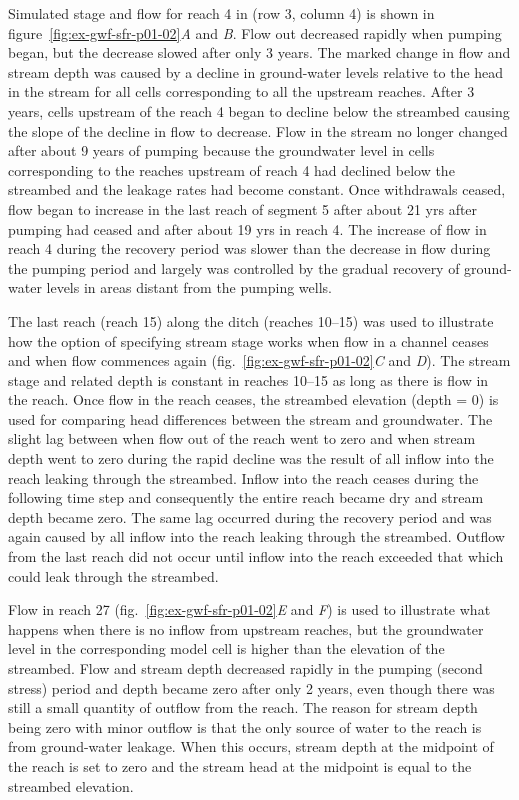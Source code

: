 Simulated stage and flow for reach 4 in (row 3, column 4) is shown in figure~\ref{fig:ex-gwf-sfr-p01-02}\textit{A} and \textit{B}. Flow out decreased rapidly when pumping began, but the decrease slowed after only 3 years. The marked change in flow and stream depth was caused by a decline in ground-water levels relative to the head in the stream for all cells corresponding to all the upstream reaches. After 3 years, cells upstream of the reach 4 began to decline below the streambed causing the slope of the decline in flow to decrease. Flow in the stream no longer changed after about 9 years of pumping because the groundwater level in cells corresponding to the reaches upstream of reach 4 had declined below the streambed and the leakage rates had become constant. Once withdrawals ceased, flow began to increase in the last reach of segment 5 after about 21 yrs after pumping had ceased and after about 19 yrs in reach 4. The increase of flow in reach 4 during the recovery period was slower than the decrease in flow during the pumping period and largely was controlled by the gradual recovery of ground-water levels in areas distant from the pumping wells.

The last reach (reach 15) along the ditch (reaches 10--15) was used to illustrate how the option of specifying stream stage works when flow in a channel ceases and when flow commences again (fig.~\ref{fig:ex-gwf-sfr-p01-02}\textit{C} and \textit{D}). The stream stage and related depth is constant in reaches 10--15 as long as there is flow in the reach. Once flow in the reach ceases, the streambed elevation (depth = 0) is used for comparing head differences between the stream and groundwater. The slight lag between when flow out of the reach went to zero and when stream depth went to zero during the rapid decline was the result of all inflow into the reach leaking through the streambed. Inflow into the reach ceases during the following time step and consequently the entire reach became dry and stream depth became zero. The same lag occurred during the recovery period and was again caused by all inflow into the reach leaking through the streambed. Outflow from the last reach did not occur until inflow into the reach exceeded that which could leak through the streambed.

Flow in reach 27 (fig.~\ref{fig:ex-gwf-sfr-p01-02}\textit{E} and \textit{F}) is used to illustrate what happens when there is no inflow from upstream reaches, but the groundwater level in the corresponding model cell is higher than the elevation of the streambed. Flow
and stream depth decreased rapidly in the pumping (second stress) period and depth became zero after only 2 years, even though there was still a small quantity of outflow from the reach. The reason for stream depth being zero with minor outflow is that the only source of water to the reach is from ground-water leakage. When this occurs, stream depth at the midpoint of the reach
is set to zero and the stream head at the midpoint is equal to the streambed elevation.


